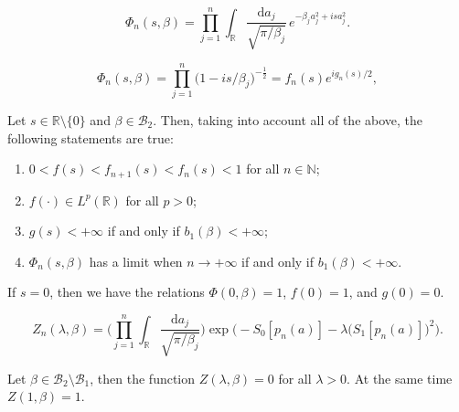 \documentclass[10pt,a4paper]{amsart}
\begin{document}
\begin{equation}\label{34-1}
\Phi_n(s,\beta)=
\prod_{j=1}^{n}\int_{\mathbb{R}}\frac{\mathrm{d}a_j}{\sqrt{\pi/\beta_j}}
\,e^{-\beta_j^{\phantom{1}}a_j^2+isa_j^2}.
\end{equation}

\begin{equation}\label{34-5}
\Phi_n(s,\beta)=\prod_{j=1}^{n}\Big(1-is/\beta_j\Big)^{-\frac{1}{2}}=
f_n(s)e^{ig_n(s)/2},
\end{equation}

\begin{lemma}\label{34-l-2} Let $s\in\mathbb{R}\setminus\{0\}$ and $\beta\in\mathcal{B}_2$. Then, taking into account all of the above, the following statements are true:
	\begin{enumerate}
		\item $0<f(s)<f_{n+1}(s)< f_{n}(s)<1$ for all $n\in\mathbb{N}$;
		\item $f(\cdot)\in L^p(\mathbb{R})$ for all $p>0$;
		\item $g(s)<+\infty$ if and only if $b_1(\beta)<+\infty$;
		\item $\Phi_n(s,\beta)$ has a limit when $n\to+\infty$ if and only if $b_1(\beta)<+\infty$.
	\end{enumerate}
If $s=0$, then we have the relations $\Phi(0,\beta)=1$, $f(0)=1$, and $g(0)=0$.
\end{lemma}

\begin{equation}\label{34-17}
	Z_n(\lambda,\beta)=
	\Bigg(\prod_{j=1}^{n}\int_{\mathbb{R}}\frac{\mathrm{d}a_j}{\sqrt{\pi/\beta_j}}\Bigg)
	\exp\bigg(-S_0[p_n(a)]-\lambda\Big(S_1[p_n(a)]\Big)^2\bigg).
\end{equation}

\begin{lemma}\label{34-l-4}
Let $\beta\in\mathcal{B}_2\setminus\mathcal{B}_1$, then the function $Z(\lambda,\beta)=0$ for all $\lambda>0$. At the same time $Z(1,\beta)=1$.
\end{lemma}
\end{document}
